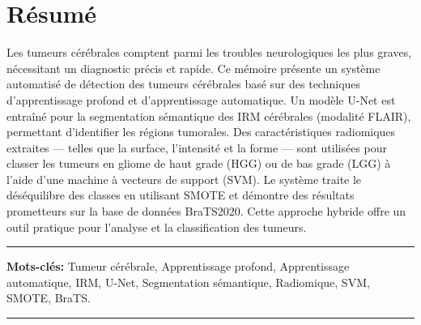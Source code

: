 \chapter*{\hfill Résumé \hfill}

Les tumeurs cérébrales comptent parmi les troubles neurologiques les plus graves, nécessitant un diagnostic précis et rapide. Ce mémoire présente un système automatisé de détection des tumeurs cérébrales basé sur des techniques d'apprentissage profond et d'apprentissage automatique. Un modèle U-Net est entraîné pour la segmentation sémantique des IRM cérébrales (modalité FLAIR), permettant d’identifier les régions tumorales. Des caractéristiques radiomiques extraites — telles que la surface, l’intensité et la forme — sont utilisées pour classer les tumeurs en gliome de haut grade (HGG) ou de bas grade (LGG) à l’aide d’une machine à vecteurs de support (SVM). Le système traite le déséquilibre des classes en utilisant SMOTE et démontre des résultats prometteurs sur la base de données BraTS2020. Cette approche hybride offre un outil pratique pour l’analyse et la classification des tumeurs.

\noindent\rule{\textwidth}{0.2pt} \hspace{0pt}
\textbf{Mots-clés:} Tumeur cérébrale, Apprentissage profond, Apprentissage automatique, IRM, U-Net, Segmentation sémantique, Radiomique, SVM, SMOTE, BraTS.

\noindent\rule{\textwidth}{0.2pt} \hspace{0pt}
